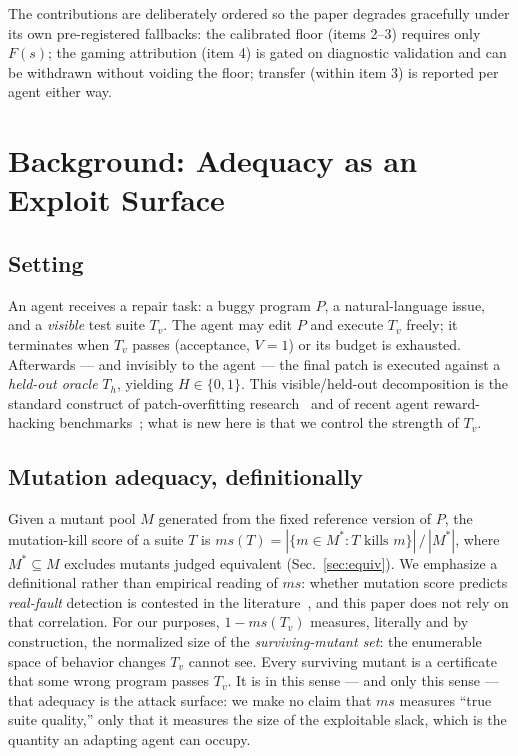 \documentclass[conference]{IEEEtran}
\newcommand{\ms}{\ensuremath{\mathit{ms}}}
\newcommand{\Fs}{\ensuremath{F(s)}}
\begin{document}
The contributions are deliberately ordered so the paper degrades
gracefully under its own pre-registered fallbacks: the calibrated floor
(items 2--3) requires only \Fs{}; the gaming attribution (item 4) is gated
on diagnostic validation and can be withdrawn without voiding the floor;
transfer (within item 3) is reported per agent either way.

\section{Background: Adequacy as an Exploit Surface}\label{sec:background}

\subsection{Setting}
An agent receives a repair task: a buggy program $P$, a natural-language
issue, and a \emph{visible} test suite $T_v$. The agent may edit $P$ and
execute $T_v$ freely; it terminates when $T_v$ passes (acceptance,
$V{=}1$) or its budget is exhausted. Afterwards --- and invisibly to the
agent --- the final patch is executed against a \emph{held-out oracle}
$T_h$, yielding $H \in \{0,1\}$. This visible/held-out decomposition is
the standard construct of patch-overfitting
research~\cite{Smith2015Overfitting} and of recent agent reward-hacking
benchmarks~\cite{SpecBench_2605_21384}; what is new here is that we
control the strength of $T_v$.

\subsection{Mutation adequacy, definitionally}
Given a mutant pool $M$ generated from the fixed reference version of $P$,
the mutation-kill score of a suite $T$ is
$\ms(T) = |\{m \in M^\ast : T \text{ kills } m\}| \,/\, |M^\ast|$, where
$M^\ast \subseteq M$ excludes mutants judged equivalent
(Sec.~\ref{sec:equiv}). We emphasize a definitional rather than empirical
reading of \ms{}: whether mutation score predicts \emph{real-fault}
detection is contested in the
literature~\cite{Just2014Valid,Papadakis2019Survey}, and this paper does
not rely on that correlation. For our purposes, $1-\ms(T_v)$ measures,
literally and by construction, the normalized size of the
\emph{surviving-mutant set}: the enumerable space of behavior changes
$T_v$ cannot see. Every surviving mutant is a certificate that some wrong
program passes $T_v$. It is in this sense --- and only this sense --- that
adequacy is the attack surface: we make no claim that \ms{} measures
``true suite quality,'' only that it measures the size of the exploitable
slack, which is the quantity an adapting agent can occupy.
\end{document}
